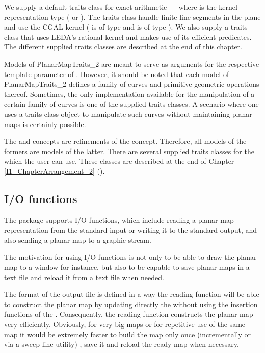 We supply a default traits class for exact arithmetic ---
 where  is the kernel
representation type ( or ).  
The traits class handle finite line segments in the plane
and use the CGAL kernel ( is of type 
 and  is of type
).
We also supply a traits class that uses LEDA's rational kernel and makes use
of its efficient predicates. The different supplied traits classes are described
at the end of this chapter.

Models of PlanarMapTraits\_2 are meant to serve as arguments for the respective
template parameter of . However, it should
be noted that
each model of PlanarMapTraits\_2 defines a family of curves and
primitive geometric operations thereof. Sometimes, the only
implementation available for the manipulation of a certain family of
curves is one of the supplied traits classes. A scenario where one
uses a traits class object to manipulate such curves without
maintaining planar maps is certainly possible.

The  and  
concepts are refinements of the  concept.
Therefore, all models of the formers are models of the latter. 
There are several supplied traits classes for the  which the user can use. 
These classes are described at the end of Chapter \ref{I1_ChapterArrangement_2}
().

\subsection*{I/O functions}
The  package supports I/O functions, which include reading a planar map representation from 
the standard input or writing it to the standard output, 
and also sending a planar map to a graphic stream.

The motivation for using I/O functions is not only to be able to draw 
the planar map to a window for instance, 
but also to be capable to save planar maps in a text file
and reload it from a text file when needed.

The format of the output file is defined in a way the reading function
will be able to construct the planar map by updating directly the
 without using the insertion functions of the .  Consequently, the reading function constructs the planar map
very efficiently. Obviously, for very big maps or for repetitive use
of the same map it would be extremely faster to build the map only once 
(incrementally or via a sweep line utility)
, save it and reload the ready map when necessary.

